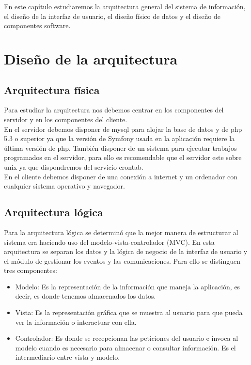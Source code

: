

En este capítulo estudiaremos la arquitectura general del sistema de información, el diseño de la interfaz de usuario, el diseño físico de datos y el diseño de componentes software.

\section{Diseño de la arquitectura}
\subsection{Arquitectura física}
Para estudiar la arquitectura nos debemos centrar en los componentes del servidor y en los componentes del cliente.\\
En el servidor debemos disponer de mysql para alojar la base de datos y de php 5.3 o superior ya que la versión de Symfony usada en la aplicación requiere la última versión de php. También disponer de un sistema para ejecutar trabajos programados en el servidor, para ello es recomendable que el servidor este sobre unix ya que dispondremos del servicio crontab.\\
En el cliente debemos disponer de una conexión a internet y un ordenador con cualquier sistema operativo y navegador.

\subsection{Arquitectura lógica}

Para la arquitectura lógica se determinó que la mejor manera de estructurar al sistema era haciendo uso del modelo-vista-controlador (MVC). En esta arquitectura se separan los datos y la lógica de negocio de la interfaz de usuario y el módulo de gestionar los eventos y las comunicaciones. Para ello se distinguen tres componentes:

\begin{itemize}
\item Modelo: Es la representación de la información que maneja la aplicación, es decir, es donde tenemos almacenados los datos. 

\item Vista: Es la representación gráfica que se muestra al usuario para que pueda ver la información o interactuar con ella.

\item Controlador: Es donde se recepcionan las peticiones del usuario e invoca al modelo cuando es necesario para almacenar o consultar información. Es el intermediario entre vista y modelo.
\end{itemize}

